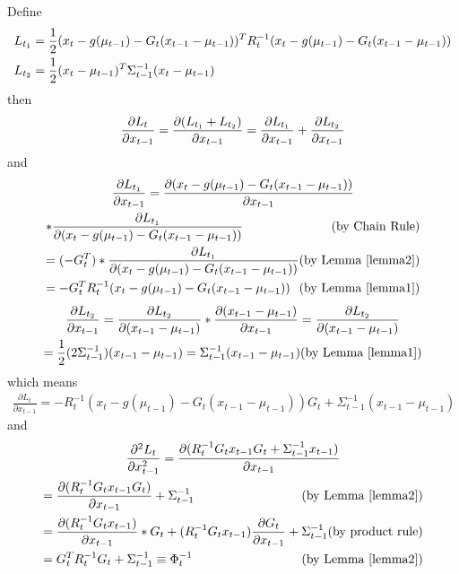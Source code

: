 Define 
\begin{multline*}
L_{t_1} = \frac{1}{2} (x_t - g(\mu_{t-1}) - G_t (x_{t-1} - \mu_{t-1}))^T R_t^{-1} (x_t - g(\mu_{t-1}) - G_t (x_{t-1} - \mu_{t-1})) \\
L_{t_2} = \frac{1}{2} (x_t - \mu_{t-1})^T \Sigma_{t-1}^{-1} (x_t - \mu_{t-1}) \hfill
\end{multline*}
then
\begin{multline*}
\frac{\partial L_t}{\partial x_{t-1}} = \frac{\partial (L_{t_1} + L_{t_2})}{\partial x_{t-1}} = \frac{\partial L_{t_1}}{\partial x_{t-1}} + \frac{\partial L_{t_2}}{\partial x_{t-1}} \hfill
\end{multline*}
and
\begin{multline*}
\frac{\partial L_{t_1}}{\partial x_{t-1}} = \frac{\partial (x_t - g(\mu_{t-1}) - G_t (x_{t-1} - \mu_{t-1}))}{\partial x_{t-1}} \\ 
* \frac{\partial L_{t_1}}{\partial (x_t - g(\mu_{t-1}) - G_t (x_{t-1} - \mu_{t-1}))} \hfill \text{(by Chain Rule)} \\
= (-G_t^T) * \frac{\partial L_{t_1}}{\partial (x_t - g(\mu_{t-1}) - G_t (x_{t-1} - \mu_{t-1}))} \hfill \text{(by Lemma \ref{lemma2})} \\
= -G_t^TR_t^{-1}(x_t - g(\mu_{t-1}) - G_t (x_{t-1} - \mu_{t-1})) \hfill \text{(by Lemma \ref{lemma1})}
\end{multline*}
\begin{multline*}
\frac{\partial L_{t_2}}{\partial x_{t-1}} = \frac{\partial L_{t_2}}{\partial (x_{t-1} - \mu_{t-1})} * \frac{\partial (x_{t-1} - \mu_{t-1})}{\partial x_{t-1}} = \frac{\partial L_{t_2}}{\partial (x_{t-1} - \mu_{t-1})} \\
= \frac{1}{2} (2\Sigma_{t-1}^{-1}) (x_{t-1} - \mu_{t-1}) =  \Sigma_{t-1}^{-1}(x_{t-1} - \mu_{t-1}) \hfill \text{(by Lemma \ref{lemma1})}
\end{multline*}
which means
\begin{multline*}
\frac{\partial L_t}{\partial x_{t-1}} = -R_t^{-1}(x_t - g(\mu_{t-1}) - G_t (x_{t-1} - \mu_{t-1}))G_t + \Sigma_{t-1}^{-1}(x_{t-1} - \mu_{t-1})
\end{multline*}
and
\begin{multline*}
\frac{\partial^2 L_t}{\partial x_{t-1}^2} = \frac{\partial (R_t^{-1}G_tx_{t-1}G_t + \Sigma_{t-1}^{-1}x_{t-1})}{\partial x_{t-1}} \\
= \frac{\partial (R_t^{-1}G_tx_{t-1}G_t)}{\partial x_{t-1}} + \Sigma_{t-1}^{-1} \hfill \text{(by Lemma \ref{lemma2})} \\
= \frac{\partial (R_t^{-1}G_tx_{t-1})}{\partial x_{t-1}}*G_t + (R_t^{-1}G_tx_{t-1}) \frac{\partial G_t}{\partial x_{t-1}} + \Sigma_{t-1}^{-1} \hfill \text{(by product rule)} \\
= G_t^TR_t^{-1}G_t + \Sigma_{t-1}^{-1} \equiv \Phi_t^{-1} \hfill \text{(by Lemma \ref{lemma2})}
\end{multline*}


